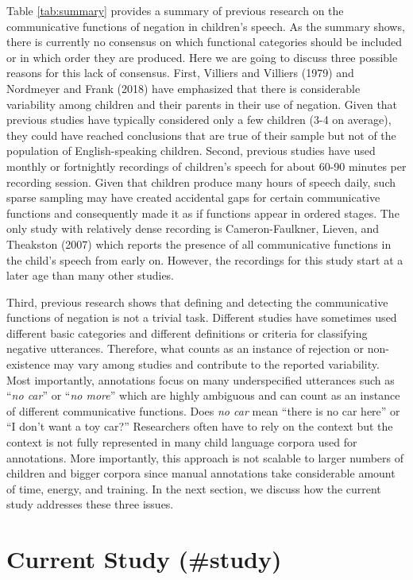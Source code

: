 \documentclass[
  english,
  man,floatsintext]{apa6}
\begin{document}
Table \ref{tab:summary} provides a summary of previous research on the communicative functions of negation in children's speech. As the summary shows, there is currently no consensus on which functional categories should be included or in which order they are produced. Here we are going to discuss three possible reasons for this lack of consensus. First, Villiers and Villiers (1979) and Nordmeyer and Frank (2018) have emphasized that there is considerable variability among children and their parents in their use of negation. Given that previous studies have typically considered only a few children (3-4 on average), they could have reached conclusions that are true of their sample but not of the population of English-speaking children. Second, previous studies have used monthly or fortnightly recordings of children's speech for about 60-90 minutes per recording session. Given that children produce many hours of speech daily, such sparse sampling may have created accidental gaps for certain communicative functions and consequently made it as if functions appear in ordered stages. The only study with relatively dense recording is Cameron-Faulkner, Lieven, and Theakston (2007) which reports the presence of all communicative functions in the child's speech from early on. However, the recordings for this study start at a later age than many other studies.

Third, previous research shows that defining and detecting the communicative functions of negation is not a trivial task. Different studies have sometimes used different basic categories and different definitions or criteria for classifying negative utterances. Therefore, what counts as an instance of rejection or non-existence may vary among studies and contribute to the reported variability. Most importantly, annotations focus on many underspecified utterances such as ``\emph{no car}'' or ``\emph{no more}'' which are highly ambiguous and can count as an instance of different communicative functions. Does \emph{no car} mean ``there is no car here'' or ``I don't want a toy car?'' Researchers often have to rely on the context but the context is not fully represented in many child language corpora used for annotations. More importantly, this approach is not scalable to larger numbers of children and bigger corpora since manual annotations take considerable amount of time, energy, and training. In the next section, we discuss how the current study addresses these three issues.

\hypertarget{current-study-study}{%
\section{Current Study (\#study)}\label{current-study-study}}
\end{document}
